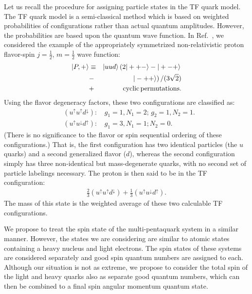 \documentclass[final,3p,times,twocolumn]{elsarticle}
\begin{document}
    Let us recall the procedure for assigning particle states in the TF quark model. The TF quark model is a semi-classical method which is based on weighted probabilities of configurations rather than actual quantum amplitudes. However, the probabilities are based upon the quantum wave function. In Ref.~\cite{Liu:2012my}, we considered the example of the appropriately symmetrized non-relativistic proton flavor-spin $j=\frac{1}{2}$, $m=\frac{1}{2}$ wave function:
    \begin{eqnarray}
        |P,+\rangle &\equiv& |uud\rangle \left(2|++-\rangle-|+-+\rangle \right. \nonumber \\
        &-& \left. |-++\rangle\right)/(3\sqrt{2}) \nonumber \\
        &+& {\rm cyclic\, permutations}.
        \label{proton}
    \end{eqnarray}
    Using the flavor degeneracy factors, these two configurations are classified as:
    \begin{eqnarray*}
    & (u^{\uparrow}u^{\uparrow}d^{\downarrow}):& \, g_1=1, N_1=2;\, g_2=1, N_2=1.\\ 
    & (u^{\uparrow}u^{\downarrow}d^{\uparrow}):& \, g_1=3, N_1=1; N_2=0.  \label{pconfig3}
    \end{eqnarray*}
    (There is no significance to the flavor or spin sequential ordering of these configurations.) That is, the first configuration has two identical particles (the $u$ quarks) and a second generalized flavor ($d$), whereas the second configuration simply has three non-identical but mass-degenerate quarks, with no second set of particle labelings necessary. The proton is then said to be in the TF configuration:
    \begin{eqnarray*}
    \frac{2}{3}(u^{\uparrow}u^{\uparrow}d^{\downarrow})+\frac{1}{3}(u^{\uparrow}u^{\downarrow}d^{\uparrow}).   \label{pconfig2}
    \end{eqnarray*}
    The mass of this state is the weighted average of these two calculable TF configurations.
    
    We propose to treat the spin state of the multi-pentaquark system in a similar manner. However, the states we are considering are similar to atomic states containing a heavy nucleus and light electrons. The spin states of these systems are considered separately and good spin quantum numbers are assigned to each. Although our situation is not as extreme, we propose to consider the total spin of the light and heavy quarks also as separate good quantum numbers, which can then be combined to a final spin angular momentum quantum state. 
    
\end{document}
